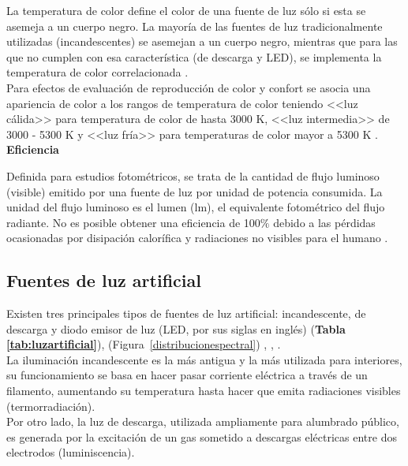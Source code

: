 La temperatura de color define el color de una fuente de luz sólo si esta se asemeja a un cuerpo negro. La mayoría de las fuentes de luz tradicionalmente utilizadas (incandescentes) se asemejan a un cuerpo negro, mientras que para las que no cumplen con esa característica (de descarga y LED), se implementa la temperatura de color correlacionada \citep{LibroCL}.\\

Para efectos de evaluación de reproducción de color y confort se asocia una apariencia de color a los rangos de temperatura de color teniendo <<luz cálida>> para temperatura de color de hasta 3000 K, <<luz intermedia>> de 3000 - 5300 K y <<luz fría>> para temperaturas de color mayor a 5300 K \citep{Globaldiscussion}.\\


\textbf{Eficiencia}

Definida para estudios fotométricos, se trata de la cantidad de flujo luminoso (visible) emitido por una fuente de luz por unidad de potencia consumida. La unidad del flujo luminoso es el lumen (lm), el equivalente fotométrico del flujo radiante. No es posible obtener una eficiencia de 100$\%$ debido a las pérdidas ocasionadas por disipación calorífica y radiaciones no visibles para el humano \citep{LibroCL}.


\subsection{Fuentes de luz artificial}
\label{subsec:fuentesdeluz}

Existen tres principales tipos de fuentes de luz artificial: incandescente, de descarga y diodo emisor de luz (LED, por sus siglas en inglés) (\textbf{Tabla \ref{tab:luzartificial}}), (Figura~\ref{distribucionespectral})  \citep{Solano2013b}, \citep{Eldvidge2010}, \citep{LibroCL}.\\

La iluminación incandescente es la más antigua y la más utilizada para interiores, su funcionamiento se basa en hacer pasar corriente eléctrica a través de un filamento, aumentando su temperatura hasta hacer que emita radiaciones visibles (termorradiación).\\

Por otro lado, la luz de descarga, utilizada ampliamente para alumbrado público, es generada por la excitación de un gas sometido a descargas eléctricas entre dos electrodos (luminiscencia).\\

